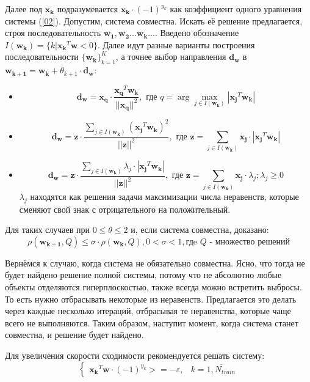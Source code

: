 \documentclass[a4paper]{article}
\newcommand{\ik}{I(\wk)}
\newcommand{\w}{\bm{w}}
\newcommand{\wk}{\bm{w_k}}
\newcommand{\xj}{\bm{x_j}}
\newcommand{\yk}{y_k}
\newcommand{\xk}{\bm{x_k}}
\begin{document}
Далее под $\xk$ подразумевается $\xk \cdot (-1)^{y_k}$ как коэффициент одного уравнения системы (\ref{02}). Допустим, система совместна. Искать её решение предлагается, строя последовательность $\bm{w_1}, \bm{w_2} ... \wk ...$. Введено обозначение $I(\wk) = \{k|\xk^T\w < 0\}$. Далее идут разные варианты построения последовательности $\{\wk\}_{k = 1}^{K}$, а точнее выбор направления $\bm{d_w}$ в $\bm{w_{k + 1}} = \wk + \theta_{k+1} \cdot \bm{d_w}$:
\begin{itemize}

\item
\begin{equation}
\bm{d_w} = \bm{x_q} \cdot \frac{\bm{x_q}^T\wk}{||\bm{x_q}||^2}, \text{ где } q = \arg\underset{j \in \ik}{\max} |\xj^T\wk|
\end{equation}

\item
\begin{equation} \label{04}
\bm{d_w} = \bm{z} \cdot \frac{\sum_{j \in \ik} (\xj^T\wk)^2 }{||\bm{z}||^2}, \text{ где } \bm{z} = \sum_{j \in \ik}\xj \cdot |\xj^T\wk|
\end{equation}

\item
\begin{equation}
\bm{d_w} = \bm{z} \cdot \frac{\sum_{j \in \ik} \lambda_j \cdot |\xj^T\wk| }{||\bm{z}||^2}, \text{ где }  \bm{z} = \sum_{j \in \ik} \xj \cdot \lambda_j; \lambda_j \ge 0
\end{equation}
$\lambda_j$ находятся как решения задачи максимизации числа неравенств, которые сменяют свой знак с отрицательного на положительный.
\end{itemize}
Для таких случаев при $0 \le \theta \le 2$ и, если система совместна, доказано\cite{agmon}:
$$
\rho(\bm{w_{k+1}}, Q) \le \sigma \cdot \rho(\bm{w_{k}}, Q), 0 < \sigma < 1 
, \text{гдe }Q \text{ - множество решений}
$$

Вернёмся к случаю, когда система не обязательно совместна. Ясно, что тогда не будет найдено решение полной системы, потому что не абсолютно любые объекты отделяются гиперплоскостью, также всегда можно встретить выбросы. То есть нужно отбрасывать некоторые из неравенств. Предлагается это делать через каждые несколько итераций, отбрасывая те неравенства, которые чаще всего не выполняются. Таким образом, наступит момент, когда система станет совместна, и решение будет найдено.

Для увеличения скорости сходимости рекомендуется решать систему:
\begin{equation}
\begin{cases}
\xk^T\w \cdot (-1) ^ {\yk} >= - \varepsilon, & k = \overline{1,N_{train}} 
\end{cases}
\end{equation}
\end{document}
